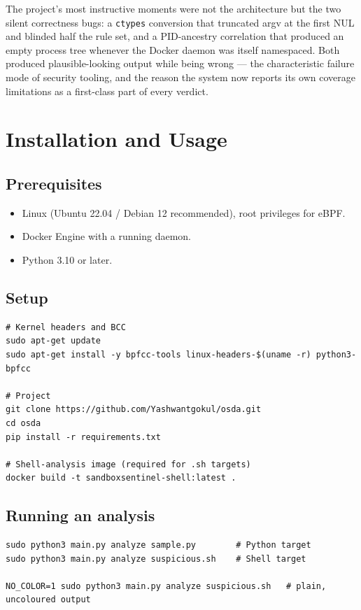 \documentclass[11pt,a4paper]{article}
\newcommand{\code}[1]{\texttt{\small #1}}
\begin{document}
The project's most instructive moments were not the architecture but the two silent
correctness bugs: a \code{ctypes} conversion that truncated argv at the first NUL
and blinded half the rule set, and a PID-ancestry correlation that produced an empty
process tree whenever the Docker daemon was itself namespaced. Both produced
plausible-looking output while being wrong --- the characteristic failure mode of
security tooling, and the reason the system now reports its own coverage limitations
as a first-class part of every verdict.

\appendix
\section{Installation and Usage}

\subsection{Prerequisites}
\begin{itemize}[leftmargin=*,itemsep=1pt]
  \item Linux (Ubuntu 22.04 / Debian 12 recommended), root privileges for eBPF.
  \item Docker Engine with a running daemon.
  \item Python 3.10 or later.
\end{itemize}

\subsection{Setup}
\begin{lstlisting}[style=term]
# Kernel headers and BCC
sudo apt-get update
sudo apt-get install -y bpfcc-tools linux-headers-$(uname -r) python3-bpfcc

# Project
git clone https://github.com/Yashwantgokul/osda.git
cd osda
pip install -r requirements.txt

# Shell-analysis image (required for .sh targets)
docker build -t sandboxsentinel-shell:latest .
\end{lstlisting}

\subsection{Running an analysis}
\begin{lstlisting}[style=term]
sudo python3 main.py analyze sample.py        # Python target
sudo python3 main.py analyze suspicious.sh    # Shell target

NO_COLOR=1 sudo python3 main.py analyze suspicious.sh   # plain, uncoloured output
\end{lstlisting}
\end{document}
